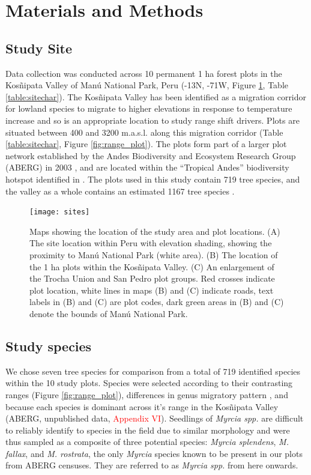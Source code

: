 \documentclass[a4paper, 11pt]{article}
\newcommand{\todo}[1]{\textcolor{red}{#1}}   %
\begin{document}
\section{Materials and Methods}
\subsection{Study Site}
Data collection was conducted across 10 permanent 1 ha forest plots in the Kos\~{n}ipata Valley of Man\'{u} National Park, Peru (-13\textdegree N, -71\textdegree W, Figure \ref{fig:sites}, Table \ref{table:sitechar}). The Kos\~{n}ipata Valley has been identified as a migration corridor for lowland species to migrate to higher elevations in response to temperature increase \citep{Feeley2011} and so is an appropriate location to study range shift drivers. Plots are situated between 400 and 3200 m.a.s.l. along this migration corridor (Table \ref{table:sitechar}, Figure \ref{fig:range_plot}). The plots form part of a larger plot network established by the Andes Biodiversity and Ecosystem Research Group (ABERG) in 2003 \citep{Malhi2010, Girardin2014}, and are located within the ``Tropical Andes'' biodiversity hotspot identified in \citet{Myers2000}. The plots used in this study contain 719 tree species, and the valley as a whole contains an estimated 1167 tree species \citep{}.

\begin{figure}[H]
\texttt{[image: sites]}
\centering
\caption{Maps showing the location of the study area and plot locations. (A) The site location within Peru with elevation shading, showing the proximity to Man\'{u} National Park (white area). (B) The location of the 1 ha plots within the Kos\~{n}ipata Valley. (C) An enlargement of the Trocha Union and San Pedro plot groups. Red crosses indicate plot location, white lines in maps (B) and (C) indicate roads, text labels in (B) and (C) are plot codes, dark green areas in (B) and (C) denote the bounds of Man\'{u} National Park.}
\label{fig:sites}
\end{figure}

\subsection{Study species} 
We chose seven tree species for comparison from a total of 719 identified species within the 10 study plots. Species were selected according to their contrasting ranges (Figure \ref{fig:range_plot}), differences in genus migratory pattern \citep{Feeley2011}, and because each species is dominant across it's range in the Kos\~{n}ipata Valley (ABERG, unpublished data, \todo{Appendix VI}). Seedlings of \textit{Myrcia spp.} are difficult to reliably identify to species in the field due to similar morphology and were thus sampled as a composite of three potential species: \textit{Myrcia splendens}, \textit{M. fallax}, and \textit{M. rostrata}, the only \textit{Myrcia} species known to be present in our plots from ABERG censuses. They are referred to as \textit{Myrcia spp.} from here onwards. 
\end{document}
